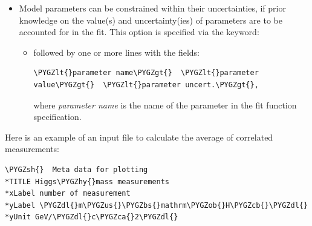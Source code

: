 \documentclass[a4paper,10pt,english]{sphinxmanual}
\def\PYGZbs{\char`\\}
\def\PYGZus{\char`\_}
\def\PYGZob{\char`\{}
\def\PYGZcb{\char`\}}
\def\PYGZca{\char`\^}
\def\PYGZlt{\char`\<}
\def\PYGZgt{\char`\>}
\def\PYGZsh{\char`\#}
\def\PYGZdl{\char`\$}
\def\PYGZhy{\char`\-}
\def\PYGZti{\char`\~}
\begin{document}
\begin{fulllineitems}
\begin{itemize}
\begin{itemize}
\begin{Verbatim}[commandchars=\\\{\}]
def fitf(x, ...):
\PYGZti{}\PYGZti{}\PYGZti{}\PYGZti{}...
\PYGZti{}\PYGZti{}\PYGZti{}\PYGZti{}return ...
\end{Verbatim}

The name \emph{fitf} is mandatory. The kafe decorator functions
,  and 
are suppoted.

\item {} 
 \textless{}the name for the fit\textgreater{}

\item {} 
 -  followed by two columns of float values
for the initial values of the parameters and their range, one line
per fit parameter is mandatory
\begin{quote}

\textless{}initial value\textgreater{}  \textless{}range\textgreater{}
\end{quote}

\end{itemize}

\item {} 
Model parameters can be constrained within their uncertainties, if prior
knowledge on the value(s) and uncertainty(ies) of parameters are
to be accounted for in the fit. This option is specified via the
keyword:
\begin{itemize}
\item {} 
 followed by one or more lines with
the fields:

\begin{Verbatim}[commandchars=\\\{\}]
\PYGZlt{}parameter name\PYGZgt{}  \PYGZlt{}parameter value\PYGZgt{}  \PYGZlt{}parameter uncert.\PYGZgt{},
\end{Verbatim}

where \emph{parameter name} is the name of the parameter in the fit
function specification.

\end{itemize}

\end{itemize}

Here is an example of an input file to calculate the average
of correlated measurements:

\begin{Verbatim}[commandchars=\\\{\}]
\PYGZsh{}  Meta data for plotting
*TITLE Higgs\PYGZhy{}mass measurements
*xLabel number of measurement
*yLabel \PYGZdl{}m\PYGZus{}\PYGZbs{}mathrm\PYGZob{}H\PYGZcb{}\PYGZdl{}
*yUnit GeV/\PYGZdl{}c\PYGZca{}2\PYGZdl{}


\end{Verbatim}
\end{fulllineitems}
\end{document}
